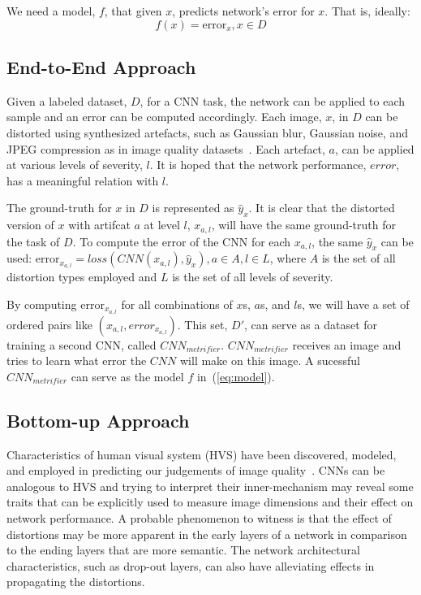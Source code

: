\documentclass{article}
\begin{document}
We need a model, $f$, that given $x$, predicts network's error for $x$. That is, ideally:
\begin{equation}
	\label{eq:model}
	f(x) = \text{error}_x, x\in D
\end{equation}
\subsection{End-to-End Approach} \label{sec:end_to_end}
Given a labeled dataset, $D$, for a CNN task, the network can be applied to each sample and an error can be computed accordingly. Each image, $x$, in $D$ can be distorted using synthesized artefacts, such as Gaussian blur, Gaussian noise, and JPEG compression as in image quality datasets~\cite{sheikh2005live}. Each artefact, $a$, can be applied at various levels of severity, $l$. It is hoped that the network performance, $error$, has a meaningful relation with $l$.

The ground-truth for $x$ in $D$ is represented as $\hat{y}_x$. It is clear that the distorted version of $x$ with artifcat $a$ at level $l$, $x_{a, l}$, will have the same ground-truth for the task of $D$. To compute the error of the CNN for each $x_{a,l}$, the same $\hat{y}_x$ can be used: $\text{error}_{x_{a, l}} = loss(CNN(x_{a,l}), \hat{y}_x), a\in A, l\in L$, where $A$ is the set of all distortion types employed and $L$ is the set of all levels of severity.

By computing $\text{error}_{x_{a, l}}$ for all combinations of $x$s, $a$s, and $l$s, we will have a set of ordered pairs like $(x_{a, l}, error_{x_{a, l}})$. This set, $D\prime$, can serve as a dataset for training a second CNN, called $CNN_{metrifier}$. $CNN_{metrifier}$ receives an image and tries to learn what error the $CNN$ will make on this image. A sucessful $CNN_{metrifier}$ can serve as the model $f$ in~(\ref{eq:model}).
\subsection{Bottom-up Approach} \label{sec:bottom_up}
Characteristics of human visual system (HVS) have been discovered, modeled, and employed in predicting our judgements of image quality~\cite{zhai2020perceptual, fry2018bridging}. CNNs can be analogous to HVS and trying to interpret their inner-mechanism may reveal some traits that can be explicitly used to measure image dimensions and their effect on network performance. A probable phenomenon to witness is that the effect of distortions may be more apparent in the early layers of a network in comparison to the ending layers that are more semantic. The network architectural characteristics, such as drop-out layers, can also have alleviating effects in propagating the distortions.
\end{document}
